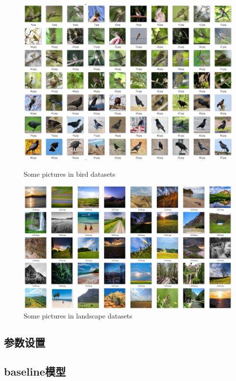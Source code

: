 \documentclass{article}
\begin{document}
\begin{CJK*}{UTF8}{gbsn}
	\begin{figure}[htbp]
		\begin{minipage}{0.5\linewidth}
			\centering\includegraphics[scale=0.15]{res/bird.png}
			\caption{Some pictures in bird datasets}
		\end{minipage}
		\begin{minipage}{0.5\linewidth}
			\centering\includegraphics[scale=0.15]{res/landscape.png}
			\caption{Some pictures in landscape datasets}
		\end{minipage}
	\end{figure}
	
	
  \subsection{参数设置}
    

  \subsection{baseline模型}


\end{CJK*}
\end{document}
